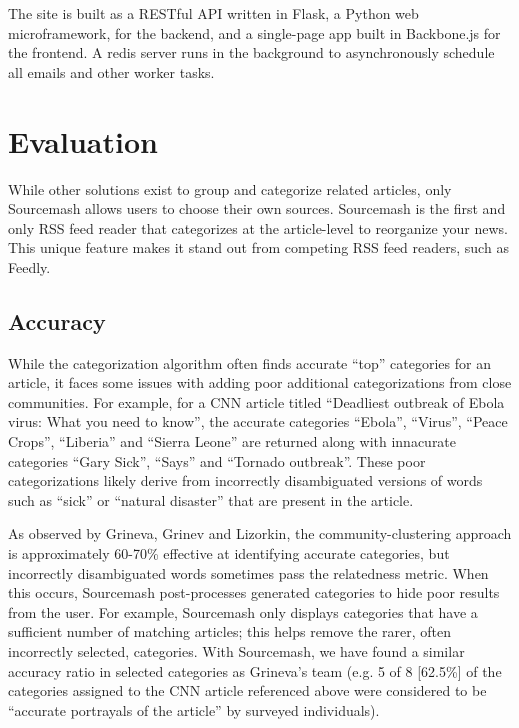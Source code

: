\documentclass[11pt]{article}
\begin{document}
The site is built as a RESTful API written in Flask, a Python web microframework, for the backend, and a single-page app built in Backbone.js for the frontend. A redis server runs in the background to asynchronously schedule all emails and other worker tasks.


\section{Evaluation}

While other solutions exist to group and categorize related articles, only Sourcemash allows users to choose their own sources. Sourcemash is the first and only RSS feed reader that categorizes at the article-level to reorganize your news. This unique feature makes it stand out from competing RSS feed readers, such as Feedly.

\subsection{Accuracy}
While the categorization algorithm often finds accurate ``top'' categories for an article, it faces some issues with adding poor additional categorizations from close communities. For example, for a CNN article titled ``Deadliest outbreak of Ebola virus: What you need to know''\cite{Ebola}, the accurate categories ``Ebola'', ``Virus'', ``Peace Crops'', ``Liberia'' and ``Sierra Leone'' are returned along with innacurate categories ``Gary Sick'', ``Says'' and ``Tornado outbreak''. These poor categorizations likely derive from incorrectly disambiguated versions of words such as ``sick'' or ``natural disaster'' that are present in the article. 

As observed by Grineva, Grinev and Lizorkin\cite{Grineva}, the community-clustering approach is approximately 60-70\% effective at identifying accurate categories, but incorrectly disambiguated words sometimes pass the relatedness metric. When this occurs, Sourcemash post-processes generated categories to hide poor results from the user. For example, Sourcemash only displays categories that have a sufficient number of matching articles; this helps remove the rarer, often incorrectly selected, categories. With Sourcemash, we have found a similar accuracy ratio in selected categories as Grineva's team (e.g. 5 of 8 [62.5\%] of the categories assigned to the CNN article\cite{Ebola} referenced above were considered to be ``accurate portrayals of the article'' by surveyed individuals). 
\end{document}
